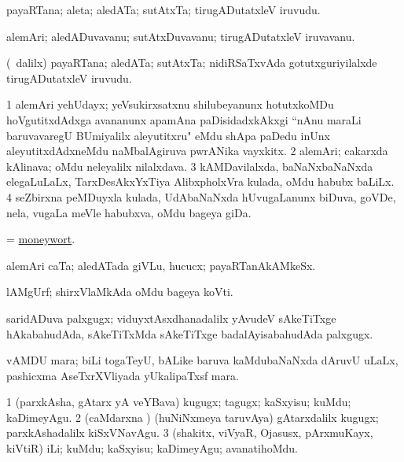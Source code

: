 \bentry
{} 
\gl{\nA}
\expl{}
\bmng
payaRTana; aleta; aledATa; sutAtxTa; tirugADutatxleV iruvudu. 
\emng
\eentry

\bentry
{} 
\gl{\nA}
\expl{}
\bmng
alemAri; aledADuvavanu; sutAtxDuvavanu; tirugADutatxleV iruvavanu. 
\emng
\eentry

\bentry
{} 
\gl{\nA}
\expl{}
\bmng
(\kanmu\ \bava dalilx) payaRTana; aledATa; sutAtxTa; nidiRSaTxvAda gotutxguriyilalxde tirugADutatxleV iruvudu. 
\emng
\eentry

\bentry
{}
\gl{\nA}
\expl{}
\bmng
\bnum
\num{1} alemAri yehUdayx; yeVsukirxsatxnu shilubeyanunx hotutxkoMDu hoVgutitxdAdxga avananunx apamAna paDisidadxkAkxgi ``nAnu maraLi baruvavaregU BUmiyalilx aleyutitxru" eMdu shApa paDedu inUnx aleyutitxdAdxneMdu naMbalAgiruva pwrANika vayxkitx. 
\num{2} alemAri; cakarxda kAlinava; oMdu neleyalilx nilalxdava. 
\num{3} kAMDavilalxda, baNaNxbaNaNxda elegaLuLaLx, TarxDesAkxYxTiya AlibxpholxVra kulada, oMdu habubx baLiLx. 
\num{4} seZbirxna peMDuyxla kulada, UdAbaNaNxda hUvugaLanunx biDuva, goVDe, nela, \mo vugaLa meVle habubxva, oMdu bageya giDa. 
\enum
\emng
\eentry

\bentry
{} 
\gl{\nA}
\expl{}
\bmng
= \hyperref{kandict_m.pdf}{M}{moneywort}{moneywort}. 
\emng
\eentry

\bentry
{} 
\gl{\nA}
\expl{}
\bmng
alemAri caTa; aledATada giVLu, hucucx; payaRTanAkAMkeSx. 
\emng
\eentry

\bentry
{} 
\gl{\nA}
\expl{}
\bmng
lAMgUrf; shirxVlaMkAda oMdu bageya koVti. 
\emng
\eentry

\bentry
{} 
\gl{\nA}
\expl{}
\bmng
saridADuva palxgugx; viduyxtAsxdhanadalilx yAvudeV sAkeTiTxge hAkabahudAda, sAkeTiTxMda sAkeTiTxge badalAyisabahudAda palxgugx. 
\emng
\eentry

\bentry
{} 
\gl{\nA}
\expl{}
\bmng
vAMDU mara; biLi togaTeyU, bALike baruva kaMdubaNaNxda dAruvU uLaLx, pashicxma AseTxrXVliyada yUkalipaTxsf mara. 
\emng
\eentry

\bentry
{} 
\gl{\akirx}
\expl{}
\bmng
\bnum
\num{1} (parxkAsha, gAtarx yA veYBava) kugugx; tagugx; kaSxyisu; kuMdu; kaDimeyAgu. 
\num{2} (caMdarxna \vi) (huNiNxmeya taruvAya) gAtarxdalilx kugugx; parxkAshadalilx kiSxVNavAgu. 
\num{3} (shakitx, viVyaR, Ojasusx, pArxmuKayx, kiVtiR) iLi; kuMdu; kaSxyisu; kaDimeyAgu; avanatihoMdu. 
\enum
\emng
\eentry

